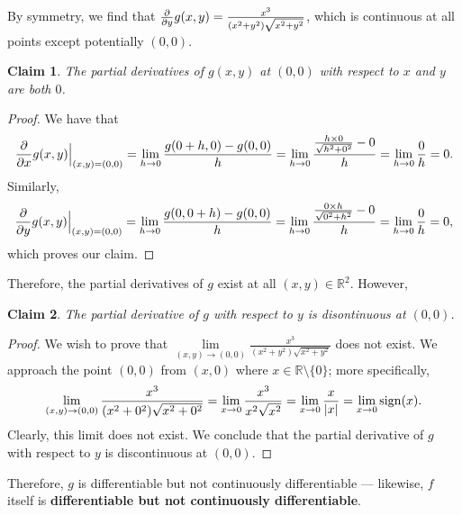 \documentclass[11pt]{article}
\newtheorem*{claim*}{Claim}
\begin{document}
By symmetry, we find that $\pdv{y} g(x, y) = \tfrac{x^{3}}{(x^{2} + y^{2})\sqrt{x^{2} + y^{2}}}$, which is continuous at all points except potentially $(0, 0)$.

\begin{adjustwidth}{1cm}{}
    \begin{claim*}
    	The partial derivatives of $g(x, y)$ at $(0, 0)$ with respect to $x$ and $y$ are both $0$.
    \end{claim*}
    \begin{proof}\renewcommand{\qedsymbol}{}
		We have that 
		\[
				\pdv{x} g(x, y) \Big|_{(x, y) = (0, 0)} = \lim\limits_{h \to 0} \frac{g(0 + h, 0)  - g(0, 0)}{h} = \lim\limits_{h \to 0} \frac{\tfrac{h \times 0}{\sqrt{h^{2} + 0^{2}}} - 0}{h} = \lim\limits_{h \to 0} \frac{0}{h} = 0.
		\]
		Similarly,
		\[
				\pdv{y} g(x, y) \Big|_{(x, y) = (0, 0)} = \lim\limits_{h \to 0} \frac{g(0, 0 + h)  - g(0, 0)}{h} = \lim\limits_{h \to 0} \frac{\tfrac{0 \times h}{\sqrt{0^{2} + h^{2}}} - 0}{h} = \lim\limits_{h \to 0} \frac{0}{h} = 0,
		\]
		which proves our claim.
	\end{proof}
\end{adjustwidth}

Therefore, the partial derivatives of $g$ exist at all $(x, y) \in \mathbb{R}^{2}$. However,
\begin{adjustwidth}{1cm}{}
    \begin{claim*}
    	The partial derivative of $g$ with respect to $y$ is disontinuous at $(0, 0)$.
    \end{claim*}
    \begin{proof}\renewcommand{\qedsymbol}{}
    	We wish to prove that $\lim\limits_{(x, y) \to (0, 0)} \frac{x^{3}}{(x^{2} + y^{2})\sqrt{x^{2} + y^{2}}}$ does not exist. We approach the point $(0, 0)$ from $(x, 0)$ where $x \in \mathbb{R} \setminus \{ 0 \}$; more specifically,
		\[
			\lim\limits_{(x, y) \to (0, 0)} \frac{x^{3}}{(x^{2} + 0^{2})\sqrt{x^{2} + 0^{2}}} = \lim\limits_{x \to 0} \frac{x^{3}}{x^{2} \sqrt{x^{2}}} = \lim\limits_{x \to 0} \frac{x}{\abs{x}} = \lim\limits_{x \to 0} \operatorname{sign} (x).
		\]
		Clearly, this limit does not exist. We conclude that the partial derivative of $g$ with respect to $y$ is discontinuous at $(0, 0)$.
    \end{proof}
\end{adjustwidth}

Therefore, $g$ is differentiable but not continuously differentiable --- likewise, $f$ itself is \textbf{differentiable but not continuously differentiable}.
\end{document}
